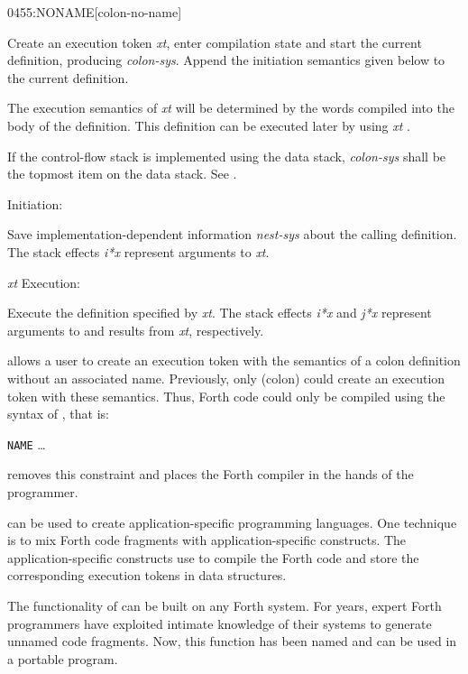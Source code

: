 \begin{newword}{0455}{:NONAME}[colon-no-name]

	Create an execution token \emph{xt}, enter compilation state
	and start the current definition, producing \emph{colon-sys}.
	Append the initiation semantics given below to the current
	definition.

	The execution semantics of \emph{xt} will be determined by the
	words compiled into the body of the definition. This definition
	can be executed later by using \emph{xt} .

	If the control-flow stack is implemented using the data stack,
	\emph{colon-sys} shall be the topmost item on the data stack.
	See .

\item[Initiation:]

	Save implementation-dependent information \emph{nest-sys} about
	the calling definition. The stack effects \emph{i*x} represent
	arguments to \emph{xt}.

\item[\emph{xt} Execution:]

	Execute the definition specified by \emph{xt}. The stack effects
	\emph{i*x} and \emph{j*x} represent arguments to and results
	from \emph{xt}, respectively.


	\begin{rationale} %
		 allows a user to create an execution token
		with the semantics of a colon definition without an associated
		name. Previously, only \word{:} (colon) could create an
		execution token with these semantics. Thus, Forth code could
		only be compiled using the syntax of \word{:}, that is:

		\tab \word{:} \texttt{NAME} {\ldots} \word{;}

		 removes this constraint and places the Forth
		compiler in the hands of the programmer.

		 can be used to create application-specific
		programming languages. One technique is to mix Forth code
		fragments with application-specific constructs. The
		application-specific constructs use  to compile
		the Forth code and store the corresponding execution tokens
		in data structures.

		The functionality of  can be built on any Forth
		system. For years, expert Forth programmers have exploited
		intimate knowledge of their systems to generate unnamed code
		fragments. Now, this function has been named and can be used
		in a portable program.


\end{rationale}
\end{newword}

